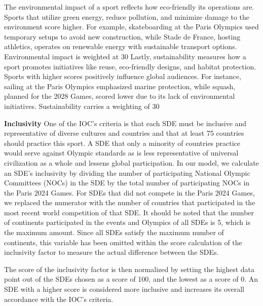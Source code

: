 \documentclass[12pt]{article}
\begin{document}
The environmental impact of a sport reflects how eco-friendly its operations are. Sports that utilize green energy, reduce pollution, and minimize damage to the environment score higher. For example, skateboarding at the Paris Olympics used temporary setups to avoid new construction, while Stade de France, hosting athletics, operates on renewable energy with sustainable transport options. Environmental impact is weighted at 30%
Lastly, sustainability measures how a sport promotes initiatives like reuse, eco-friendly designs, and habitat protection. Sports with higher scores positively influence global audiences. For instance, sailing at the Paris Olympics emphasized marine protection, while squash, planned for the 2028 Games, scored lower due to its lack of environmental initiatives. Sustainability carries a weighting of 30%

\textbf{Inclusivity}
One of the IOC’s criteria is that each SDE must be inclusive and representative of diverse cultures and countries and that at least 75 countries should practice this sport. A SDE that only a minority of countries practice would serve against Olympic standards as is less representative of universal civilization as a whole and lessens global participation. In our model, we calculate an SDE’s inclusivity by dividing the number of participating National Olympic Committees (NOCs) in the SDE by the total number of participating NOCs in the Paris 2024 Games. For SDEs that did not compete in the Paris 2024 Games, we replaced the numerator with the number of countries that participated in the most recent world competition of that SDE. It should be noted that the number of continents participated in the events and Olympics of all SDEs is 5, which is the maximum amount. Since all SDEs satisfy the maximum number of continents, this variable has been omitted within the score calculation of the inclusivity factor to measure the actual difference between the SDEs.

The score of the inclusivity factor is then normalized by setting the highest data point out of the SDEs chosen as a score of 100, and the lowest as a score of 0. An SDE with a higher score is considered more inclusive and increases its overall accordance with the IOC’s criteria.
\end{document}
